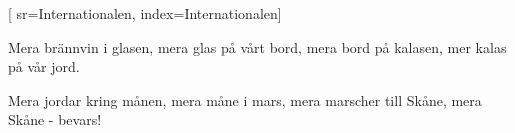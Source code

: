 [ 						
	sr={Internationalen},					
	index={Internationalen}]		
	
\beginverse*						
Mera brännvin i glasen,
mera glas på vårt bord,
mera bord på kalasen,
mer kalas på vår jord.
\endverse						

\beginverse				
Mera jordar kring månen,
mera måne i mars,
mera marscher till Skåne,
mera Skåne - bevars!
\endverse				
\endsong		
